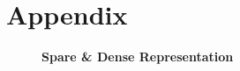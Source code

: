 \documentclass[12pt,letterpaper]{article}
\begin{document}
\section{Appendix}

\begin{figure}[!tbp]
  \begin{subfigure}[b]{0.5\textwidth}
    \label{fig:f1}
  \end{subfigure}
  \hfill
  \begin{subfigure}[b]{0.5\textwidth}
    \label{fig:f2}
  \end{subfigure}
  \caption{\bf Spare \& Dense Representation}
\end{figure}


\end{document}
